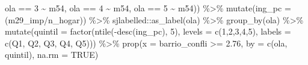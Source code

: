 \documentclass[
  12pt,
]{book}
\newenvironment{Shaded}{\begin{snugshade}}{\end{snugshade}}
\newcommand{\AttributeTok}[1]{\textcolor[rgb]{0.77,0.63,0.00}{#1}}
\newcommand{\ConstantTok}[1]{\textcolor[rgb]{0.00,0.00,0.00}{#1}}
\newcommand{\DecValTok}[1]{\textcolor[rgb]{0.00,0.00,0.81}{#1}}
\newcommand{\FloatTok}[1]{\textcolor[rgb]{0.00,0.00,0.81}{#1}}
\newcommand{\FunctionTok}[1]{\textcolor[rgb]{0.00,0.00,0.00}{#1}}
\newcommand{\NormalTok}[1]{#1}
\newcommand{\SpecialCharTok}[1]{\textcolor[rgb]{0.00,0.00,0.00}{#1}}
\newcommand{\StringTok}[1]{\textcolor[rgb]{0.31,0.60,0.02}{#1}}
\begin{document}
\begin{Shaded}
\begin{Highlighting}[]
\NormalTok{                             ola }\SpecialCharTok{==} \DecValTok{3} \SpecialCharTok{\textasciitilde{}}\NormalTok{ m54, ola }\SpecialCharTok{==} \DecValTok{4} \SpecialCharTok{\textasciitilde{}}\NormalTok{ m54, ola }\SpecialCharTok{==} \DecValTok{5} \SpecialCharTok{\textasciitilde{}}\NormalTok{ m54)) }\SpecialCharTok{\%\textgreater{}\%}
  \FunctionTok{mutate}\NormalTok{(}\AttributeTok{ing\_pc =}\NormalTok{ (m29\_imp}\SpecialCharTok{/}\NormalTok{n\_hogar)) }\SpecialCharTok{\%\textgreater{}\%}
\NormalTok{  sjlabelled}\SpecialCharTok{::}\FunctionTok{as\_label}\NormalTok{(ola) }\SpecialCharTok{\%\textgreater{}\%} 
  \FunctionTok{group\_by}\NormalTok{(ola) }\SpecialCharTok{\%\textgreater{}\%} 
  \FunctionTok{mutate}\NormalTok{(}\AttributeTok{quintil =} \FunctionTok{factor}\NormalTok{(}\FunctionTok{ntile}\NormalTok{(}\SpecialCharTok{{-}}\FunctionTok{desc}\NormalTok{(ing\_pc), }\DecValTok{5}\NormalTok{), }\AttributeTok{levels =} \FunctionTok{c}\NormalTok{(}\DecValTok{1}\NormalTok{,}\DecValTok{2}\NormalTok{,}\DecValTok{3}\NormalTok{,}\DecValTok{4}\NormalTok{,}\DecValTok{5}\NormalTok{),}
         \AttributeTok{labels =} \FunctionTok{c}\NormalTok{(}\StringTok{\textquotesingle{}Q1\textquotesingle{}}\NormalTok{, }\StringTok{\textquotesingle{}Q2\textquotesingle{}}\NormalTok{, }\StringTok{\textquotesingle{}Q3\textquotesingle{}}\NormalTok{, }\StringTok{\textquotesingle{}Q4\textquotesingle{}}\NormalTok{, }\StringTok{\textquotesingle{}Q5\textquotesingle{}}\NormalTok{))) }\SpecialCharTok{\%\textgreater{}\%} 
  \FunctionTok{prop}\NormalTok{(}\AttributeTok{x =}\NormalTok{ barrio\_confli }\SpecialCharTok{\textgreater{}=} \FloatTok{2.76}\NormalTok{, }\AttributeTok{by =} \FunctionTok{c}\NormalTok{(ola, quintil), }\AttributeTok{na.rm =} \ConstantTok{TRUE}\NormalTok{)}


\end{Highlighting}
\end{Shaded}
\end{document}
